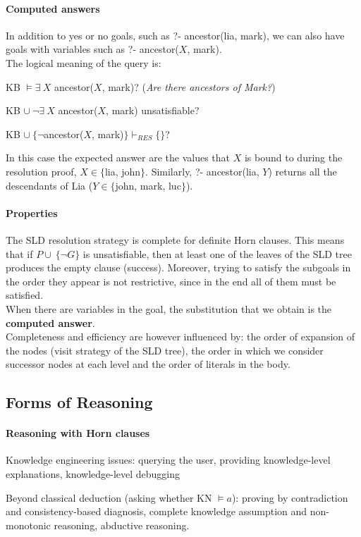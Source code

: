 \documentclass[10pt]{report}
\begin{document}
\paragraph{Computed answers} In addition to yes or no goals, such as ?- ancestor(lia, mark), we can also have goals with variables such as ?- ancestor($X$, mark).\\
The logical meaning of the query is:
\begin{list}{}{}
	\item KB $\vDash\exists\:X$ ancestor($X$, mark)? (\textit{Are there ancestors of Mark?})
	\item KB $\cup\:\neg\exists\:X$ ancestor($X$, mark) unsatisfiable?
	\item KB $\cup\:\{\neg$ancestor($X$, mark)$\}\vdash_{RES} \{\}$?
\end{list}
In this case the expected answer are the values that $X$ is bound to during the resolution proof, $X\in\{$lia, john$\}$. Similarly, ?- ancestor(lia, $Y$) returns all the descendants of Lia ($Y\in\{$john, mark, luc$\}$).
\paragraph{Properties} The SLD resolution strategy is complete for definite Horn clauses. This means that if $P\cup\:\{\neg G\}$ is unsatisfiable, then at least one of the leaves of the SLD tree produces the empty clause (success). Moreover, trying to satisfy the subgoals in the order they appear is not restrictive, since in the end all of them must be satisfied.\\
When there are variables in the goal, the substitution that we obtain is the \textbf{computed answer}.\\
Completeness and efficiency are however influenced by: the order of expansion of the nodes (visit strategy of the SLD tree), the order in which we consider successor nodes at each level and the order of literals in the body.
\subsection{Forms of Reasoning}
\paragraph{Reasoning with Horn clauses}\begin{list}{}{}
	\item Knowledge engineering issues: querying the user, providing knowledge-level explanations, knowledge-level debugging
	\item Beyond classical deduction (asking whether KN $\vDash a$): proving by contradiction and consistency-based diagnosis, complete knowledge assumption and non-monotonic reasoning, abductive reasoning.
\end{list}
\end{document}
